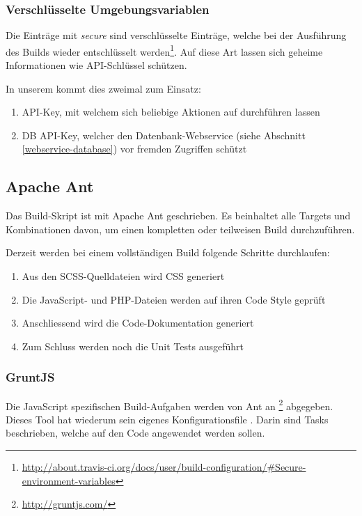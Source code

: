 \subsubsection{Verschlüsselte Umgebungsvariablen}
Die Einträge mit \emph{secure} sind verschlüsselte Einträge, welche bei der Ausführung des Builds wieder entschlüsselt werden\footnote{\url{http://about.travis-ci.org/docs/user/build-configuration/\#Secure-environment-variables}}.
Auf diese Art lassen sich geheime Informationen wie \gls{API}-Schlüssel schützen.

In unserem  kommt dies zweimal zum Einsatz:
\begin{enumerate}
\item {} \gls{API}-Key, mit welchem sich beliebige Aktionen auf  durchführen lassen
\item \kort{} DB \gls{API}-Key, welcher den Datenbank-Webservice (siehe Abschnitt \ref{webservice-database}) vor fremden Zugriffen schützt
\end{enumerate}

\subsection{Apache Ant}
Das Build-Skript ist mit Apache Ant geschrieben.
Es beinhaltet alle Targets und Kombinationen davon, um einen kompletten oder teilweisen Build durchzuführen.

Derzeit werden bei einem vollständigen Build folgende Schritte durchlaufen:
\begin{enumerate}
\item Aus den SCSS-Quelldateien wird CSS generiert
\item Die JavaScript- und PHP-Dateien werden auf ihren Code Style geprüft
\item Anschliessend wird die Code-Dokumentation generiert
\item Zum Schluss werden noch die Unit Tests ausgeführt
\end{enumerate}

\subsubsection{GruntJS}
\label{gruntjs}
Die JavaScript spezifischen Build-Aufgaben werden von Ant an \footnote{\url{http://gruntjs.com/}} abgegeben.
Dieses Tool hat wiederum sein eigenes Konfigurationsfile .
Darin sind Tasks beschrieben, welche auf den Code angewendet werden sollen.

